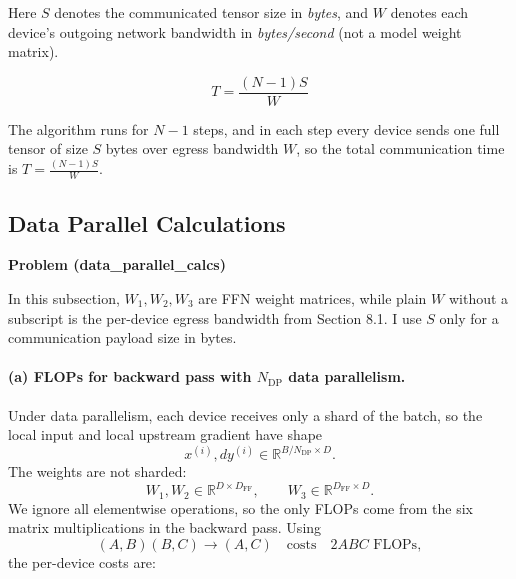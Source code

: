 \documentclass[11pt]{article}
\begin{document}
Here $S$ denotes the communicated tensor size in \emph{bytes}, and $W$
denotes each device's outgoing network bandwidth in \emph{bytes/second}
(not a model weight matrix).

\begin{equation*}
  T = \frac{(N - 1) S}{W} 
\end{equation*}

The algorithm runs for $N - 1$ steps, and in each step every device sends one 
full tensor of size $S$ bytes over egress bandwidth $W$, so the total
communication time is $T = \frac{(N - 1) S}{W}$.

\subsection{Data Parallel Calculations}
\textbf{Problem (data\_parallel\_calcs)}

In this subsection, $W_1,W_2,W_3$ are FFN weight matrices, while plain $W$
without a subscript is the per-device egress bandwidth from Section 8.1.  I
use $S$ only for a communication payload size in bytes.

\paragraph{(a) FLOPs for backward pass with $N_{\text{DP}}$ data parallelism.}

Under data parallelism, each device receives only a shard of the batch, so the
local input and local upstream gradient have shape
\[
  x^{(i)}, dy^{(i)} \in \mathbb{R}^{B/N_{\text{DP}} \times D}.
\]
The weights are not sharded:
\[
  W_1, W_2 \in \mathbb{R}^{D \times D_{\text{FF}}},
  \qquad
  W_3 \in \mathbb{R}^{D_{\text{FF}} \times D}.
\]
We ignore all elementwise operations, so the only FLOPs come from the six
matrix multiplications in the backward pass.  Using
\[
  (A,B)(B,C) \to (A,C)
  \quad\text{costs}\quad
  2ABC \text{ FLOPs},
\]
the per-device costs are:
\end{document}
